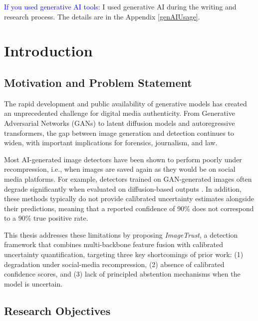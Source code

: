 \documentclass[12pt,a4paper]{book}
\theoremstyle{definition}
\theoremstyle{remark}
\begin{document}
\textcolor{blue}{If you used generative AI tools:} I used generative AI during the writing and research process. The details are in the Appendix \ref{genAIUsage}.




\newpage
\normalsize{}

\tableofcontents


\chapter{Introduction}\label{chap:intro}

\section{Motivation and Problem Statement}\label{sec:motivation}

The rapid development and public availability of generative models has created an unprecedented challenge for digital media authenticity. From Generative Adversarial Networks (GANs) \cite{goodfellow2014generative} to latent diffusion models \cite{rombach2022high} and autoregressive transformers, the gap between image generation and detection continues to widen, with important implications for forensics, journalism, and law.

Most AI-generated image detectors have been shown to perform poorly under recompression, i.e., when images are saved again as they would be on social media platforms. For example, detectors trained on GAN-generated images often degrade significantly when evaluated on diffusion-based outputs \cite{corvi2023detection}. In addition, these methods typically do not provide calibrated uncertainty estimates alongside their predictions, meaning that a reported confidence of 90\% does not correspond to a 90\% true positive rate.

This thesis addresses these limitations by proposing \textit{ImageTrust}, a detection framework that combines multi-backbone feature fusion with calibrated uncertainty quantification, targeting three key shortcomings of prior work: (1) degradation under social-media recompression, (2) absence of calibrated confidence scores, and (3) lack of principled abstention mechanisms when the model is uncertain.


\section{Research Objectives}\label{sec:objectives}
\end{document}
